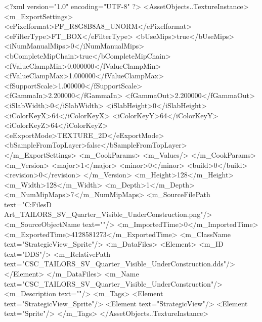 <?xml version="1.0" encoding="UTF-8" ?>
<AssetObjects..TextureInstance>
	<m_ExportSettings>
		<ePixelformat>PF_R8G8B8A8_UNORM</ePixelformat>
		<eFilterType>FT_BOX</eFilterType>
		<bUseMips>true</bUseMips>
		<iNumManualMips>0</iNumManualMips>
		<bCompleteMipChain>true</bCompleteMipChain>
		<fValueClampMin>0.000000</fValueClampMin>
		<fValueClampMax>1.000000</fValueClampMax>
		<fSupportScale>1.000000</fSupportScale>
		<fGammaIn>2.200000</fGammaIn>
		<fGammaOut>2.200000</fGammaOut>
		<iSlabWidth>0</iSlabWidth>
		<iSlabHeight>0</iSlabHeight>
		<iColorKeyX>64</iColorKeyX>
		<iColorKeyY>64</iColorKeyY>
		<iColorKeyZ>64</iColorKeyZ>
		<eExportMode>TEXTURE_2D</eExportMode>
		<bSampleFromTopLayer>false</bSampleFromTopLayer>
	</m_ExportSettings>
	<m_CookParams>
		<m_Values/>
	</m_CookParams>
	<m_Version>
		<major>1</major>
		<minor>0</minor>
		<build>0</build>
		<revision>0</revision>
	</m_Version>
	<m_Height>128</m_Height>
	<m_Width>128</m_Width>
	<m_Depth>1</m_Depth>
	<m_NumMipMaps>7</m_NumMipMaps>
	<m_SourceFilePath text="C:\Users\Shadow\Desktop\Working Files\2D Art\Quarters\Tailors\StrategicView\CSC_TAILORS_SV_Quarter_Visible_UnderConstruction.png"/>
	<m_SourceObjectName text=""/>
	<m_ImportedTime>0</m_ImportedTime>
	<m_ExportedTime>4128581273</m_ExportedTime>
	<m_ClassName text="StrategicView_Sprite"/>
	<m_DataFiles>
		<Element>
			<m_ID text="DDS"/>
			<m_RelativePath text="CSC_TAILORS_SV_Quarter_Visible_UnderConstruction.dds"/>
		</Element>
	</m_DataFiles>
	<m_Name text="CSC_TAILORS_SV_Quarter_Visible_UnderConstruction"/>
	<m_Description text=""/>
	<m_Tags>
		<Element text="StrategicView_Sprite"/>
		<Element text="StrategicView"/>
		<Element text="Sprite"/>
	</m_Tags>
</AssetObjects..TextureInstance>

